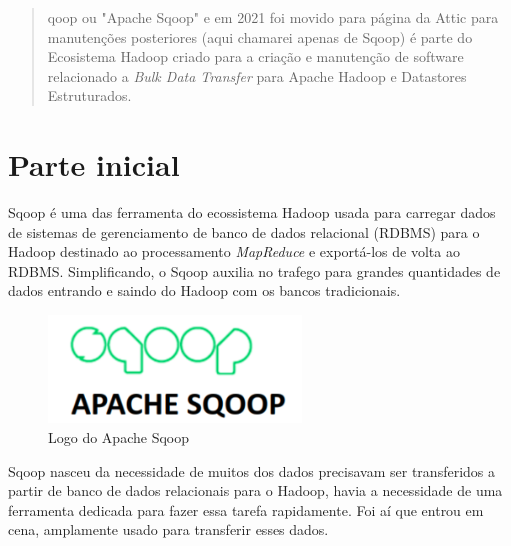 \documentclass[a4paper,11pt]{article}
\begin{document}
	
	\maketitle %
	\thispagestyle{fancy} %
	
\begin{abstract}
	qoop\cite{sqoopoficial} ou "Apache Sqoop" e em 2021 foi movido para página da Attic para manutenções posteriores (aqui chamarei apenas de Sqoop) é parte do Ecosistema Hadoop criado para a criação e manutenção de software relacionado a \textit{Bulk Data Transfer} para Apache Hadoop e Datastores Estruturados.
\end{abstract}

\section{Parte inicial}
Sqoop é uma das ferramenta do ecossistema Hadoop usada para carregar dados de sistemas de gerenciamento de banco de dados relacional (RDBMS) para o Hadoop destinado ao processamento \textit{MapReduce} e exportá-los de volta ao RDBMS. Simplificando, o Sqoop auxilia no trafego para grandes quantidades de dados entrando e saindo do Hadoop com os bancos tradicionais.
\begin{figure}[H]
	\centering
	\includegraphics[width=0.6\textwidth]{imagem/logo}
	\caption{Logo do Apache Sqoop}
\end{figure}

Sqoop nasceu da necessidade de muitos dos dados precisavam ser transferidos a partir de banco de dados relacionais para o Hadoop, havia a necessidade de uma ferramenta dedicada para fazer essa tarefa rapidamente. Foi aí que entrou em cena, amplamente usado para transferir esses dados.
\end{document}
